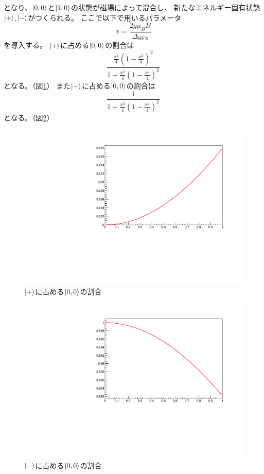 となり、$\ket{0,0}$と$\ket{1,0}$の状態が磁場によって混合し、
新たなエネルギー固有状態$\ket{+}$,$\ket{-}$がつくられる。
ここで以下で用いるパラメータ
\begin{equation}
x = \frac{2g\mu_{B}B}{\Delta_{\mathrm{HFS}}}
\end{equation}
を導入する。
$\ket{+}$に占める$\ket{0,0}$の割合は
\begin{equation}
\frac{\frac{x^{2}}{4}(1-\frac{x^{2}}{4})^{2}}{1+\frac{x^{2}}{4}(1-\frac{x^{2}}{4})^{2}}
\end{equation}
となる。（図\ref{fig:plusstate}）
また$\ket{-}$に占める$\ket{0,0}$の割合は
\begin{equation}
\frac{1}{1+\frac{x^{2}}{4}(1-\frac{x^{2}}{4})^{2}}
\end{equation}
となる。（図\ref{fig:minusstate}）

\begin{figure}[H]
\centering
\includegraphics[keepaspectratio,angle=270,scale=0.6]{fig/ybm/plusstate.pdf}
\caption{$\ket{+}$に占める$\ket{0,0}$の割合}
\label{fig:plusstate}
\end{figure}

\begin{figure}[H]
\centering
\includegraphics[keepaspectratio,angle=270,scale=0.6]{fig/ybm/minusstate.pdf}
\caption{$\ket{-}$に占める$\ket{0,0}$の割合}
\label{fig:minusstate}
\end{figure}

